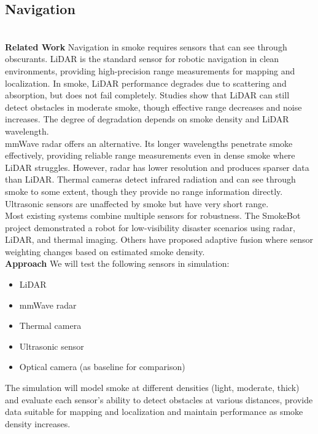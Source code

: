 \documentclass[conference]{IEEEtran}
\begin{document}
\subsection*{Navigation}\\

\textbf{Related Work}
\newline
Navigation in smoke requires sensors that can see through obscurants. LiDAR is the standard sensor for robotic navigation in clean environments, providing high-precision range measurements for mapping and localization. In smoke, LiDAR performance degrades due to scattering and absorption, but does not fail completely. Studies show that LiDAR can still detect obstacles in moderate smoke, though effective range decreases and noise increases. The degree of degradation depends on smoke density and LiDAR wavelength.\\

mmWave radar offers an alternative. Its longer wavelengths penetrate smoke effectively, providing reliable range measurements even in dense smoke where LiDAR struggles. However, radar has lower resolution and produces sparser data than LiDAR. Thermal cameras detect infrared radiation and can see through smoke to some extent, though they provide no range information directly. Ultrasonic sensors are unaffected by smoke but have very short range.\\

Most existing systems combine multiple sensors for robustness. The SmokeBot project \cite{kleiner_smokebot_2018} demonstrated a robot for low-visibility disaster scenarios using radar, LiDAR, and thermal imaging. Others have proposed adaptive fusion where sensor weighting changes based on estimated smoke density.\\

\textbf{Approach}
We will test the following sensors in simulation:

\begin{itemize}
    \item LiDAR
    \item mmWave radar
    \item Thermal camera
    \item Ultrasonic sensor
    \item Optical camera (as baseline for comparison)
\end{itemize}

The simulation will model smoke at different densities (light, moderate, thick) and evaluate each sensor's ability to detect obstacles at various distances, provide data suitable for mapping and localization and maintain performance as smoke density increases.\\
\end{document}
